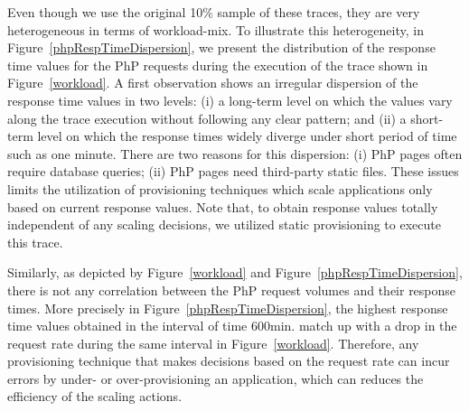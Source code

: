 Even though we use the original 10\% sample of these traces, they are very heterogeneous in terms of workload-mix. To illustrate this heterogeneity, in Figure~\ref{phpRespTimeDispersion}, we present the distribution of the response time values for the PhP requests during the execution of the trace shown in Figure~\ref{workload}. A first observation shows an irregular dispersion of the response time values in two levels: (i) a long-term level on which the values vary along the trace execution without following any clear pattern; and (ii) a short-term level on which the response times widely diverge under short period of time such as one minute. There are two reasons for this dispersion: (i) PhP pages often require database queries; (ii) PhP pages need third-party static files. These issues limits the utilization of provisioning techniques which scale applications only based on current response values. Note that, to obtain response values totally independent of any scaling decisions, we utilized static provisioning to execute this trace. 

Similarly, as depicted by Figure~\ref{workload} and Figure~\ref{phpRespTimeDispersion}, there is not any correlation between the PhP request volumes and their response times. More precisely in Figure~\ref{phpRespTimeDispersion}, the highest response time values obtained in the interval of time 600min. match up with a drop in the request rate during the same interval in Figure~\ref{workload}. Therefore, any provisioning technique that makes decisions based on the request rate can incur errors by under- or over-provisioning an application, which can reduces the efficiency of the scaling actions. 




